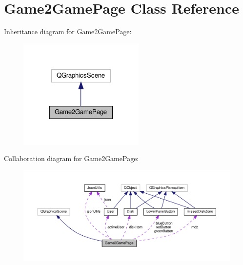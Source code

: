 \hypertarget{classGame2GamePage}{}\section{Game2\+Game\+Page Class Reference}
\label{classGame2GamePage}


Inheritance diagram for Game2\+Game\+Page\+:
\nopagebreak
\begin{figure}[H]
\begin{center}
\leavevmode
\includegraphics[width=177pt]{classGame2GamePage__inherit__graph}
\end{center}
\end{figure}


Collaboration diagram for Game2\+Game\+Page\+:
\nopagebreak
\begin{figure}[H]
\begin{center}
\leavevmode
\includegraphics[width=350pt]{classGame2GamePage__coll__graph}
\end{center}
\end{figure}
